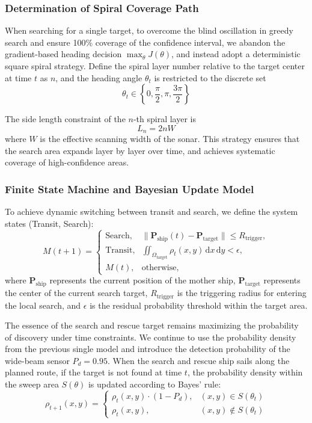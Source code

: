 \documentclass{mcmthesis}
\begin{document}
\subsubsection*{Determination of Spiral Coverage Path}
When searching for a single target,
to overcome the blind oscillation in greedy search and ensure 100\% coverage of the confidence interval,
we abandon the gradient-based heading decision $\max_{\theta} J(\theta)$,
and instead adopt a deterministic square spiral strategy.
Define the spiral layer number relative to the target center at time $t$ as $n$, and the heading angle $\theta_t$ is restricted to the discrete set
\begin{equation}
  \theta_t \in \left\{0,\frac{\pi}{2},\pi,\frac{3\pi}{2}\right\}
\end{equation}

The side length constraint of the $n$-th spiral layer is
\begin{equation}
  L_n = 2nW
\end{equation}
where $W$ is the effective scanning width of the sonar.
This strategy ensures that the search area expands layer by layer over time,
and achieves systematic coverage of high-confidence areas.
\subsubsection*{Finite State Machine and Bayesian Update Model}
To achieve dynamic switching between transit and search, we define the system states (Transit, Search):
\begin{equation}
M(t+1)=
\begin{cases}
\text{Search}, 
& \|\bm{P}_{\mathrm{ship}}(t)-\bm{P}_{\mathrm{target}}\|\le R_{\mathrm{trigger}},\\
\text{Transit}, 
& \displaystyle\iint_{\Omega_{\mathrm{target}}}\rho_t(x,y)\,\mathrm{d}x\,\mathrm{d}y < \epsilon,\\
M(t), 
& \text{otherwise},
\end{cases}
\end{equation}
where
$\bm{P}_{\mathrm{ship}}$ represents the current position of the mother ship,
$\bm{P}_{\mathrm{target}}$ represents the center of the current search target,
$R_{\mathrm{trigger}}$ is the triggering radius for entering the local search,
and $\epsilon$ is the residual probability threshold within the target area.

The essence of the search and rescue target remains maximizing the probability of discovery under time constraints.
We continue to use the probability density from the previous single model and introduce the detection probability of the wide-beam sensor $P_d=0.95$.
When the search and rescue ship sails along the planned route,
if the target is not found at time $t$, the probability density within the sweep area $S(\theta)$ is updated according to Bayes' rule:
\begin{equation}
  \rho_{t+1}(x,y)=
  \begin{cases}
    \rho_t(x,y)\cdot(1-P_d), & (x,y)\in S(\theta_t)\\
    \rho_t(x,y), & (x,y)\notin S(\theta_t)
  \end{cases}
\end{equation}
\end{document}
